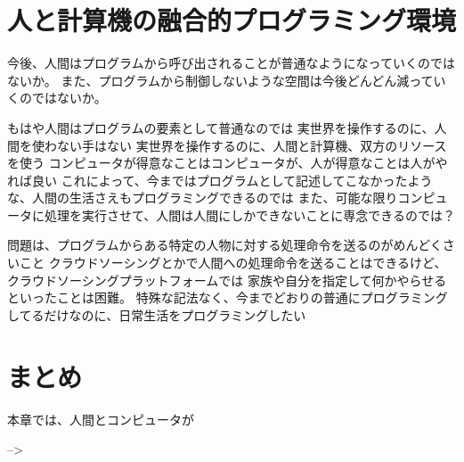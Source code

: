 \section{人と計算機の融合的プログラミング環境}\label{ux4ebaux3068ux8a08ux7b97ux6a5fux306eux878dux5408ux7684ux30d7ux30edux30b0ux30e9ux30dfux30f3ux30b0ux74b0ux5883}

今後、人間はプログラムから呼び出されることが普通なようになっていくのではないか。
また、プログラムから制御しないような空間は今後どんどん減っていくのではないか。

もはや人間はプログラムの要素として普通なのでは
実世界を操作するのに、人間を使わない手はない
実世界を操作するのに、人間と計算機、双方のリソースを使う
コンピュータが得意なことはコンピュータが、人が得意なことは人がやれば良い
これによって、今まではプログラムとして記述してこなかったような、人間の生活さえもプログラミングできるのでは
また、可能な限りコンピュータに処理を実行させて、人間は人間にしかできないことに専念できるのでは？

問題は、プログラムからある特定の人物に対する処理命令を送るのがめんどくさいこと
クラウドソーシングとかで人間への処理命令を送ることはできるけど、クラウドソーシングプラットフォームでは
家族や自分を指定して何かやらせるといったことは困難。
特殊な記法なく、今までどおりの普通にプログラミングしてるだけなのに、日常生活をプログラミングしたい

\section{まとめ}\label{ux307eux3068ux3081}

本章では、人間とコンピュータが

--\textgreater{}
